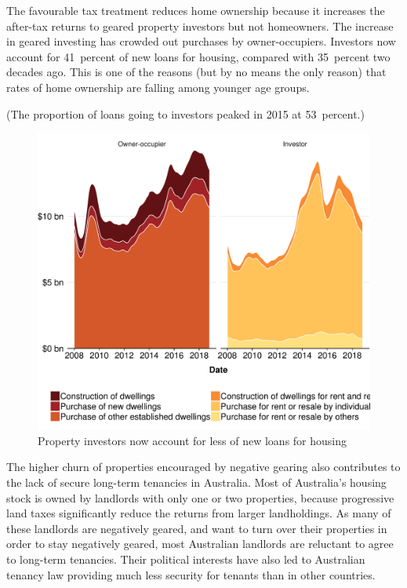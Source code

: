 \documentclass{grattan}\usepackage[]{graphicx}\usepackage[]{color}
\begin{document}
The favourable tax treatment reduces home ownership because it increases the after-tax returns to geared property investors but not homeowners. The increase in geared investing has crowded out purchases by owner-occupiers. Investors now account for 41~percent of new loans for housing, compared with 35~percent two decades ago.  This is one of the reasons (but by no means the only reason) that rates of home ownership are falling among younger age groups. 

(The proportion of loans going to investors peaked in 2015 at 53~percent.)

\begin{figure}

\caption{Property investors now account for less of new loans for housing}
\includegraphics[width=\columnwidth]{CGT-NG-atlas//valueNewLoans-vs-Date-by-Investor-1}
\end{figure}

The higher churn of properties encouraged by negative gearing also contributes to the lack of secure long-term tenancies in Australia. Most of Australia's housing stock is owned by landlords with only one or two properties, because progressive land taxes significantly reduce the returns from larger landholdings.  As many of these landlords are negatively geared, and want to turn over their properties in order to stay negatively geared, most Australian landlords are reluctant to agree to long-term tenancies. Their political interests have also led to Australian tenancy law providing much less security for tenants than in other countries. 
\end{document}
